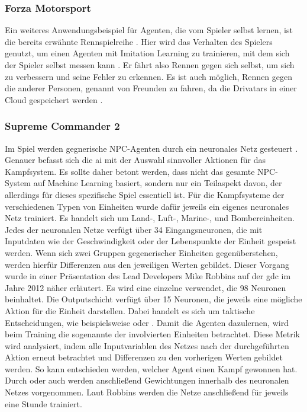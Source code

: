 \subsubsection{Forza Motorsport}
Ein weiteres Anwendungsbeispiel für Agenten, die vom Spieler selbst lernen, ist die bereits erwähnte Rennspielreihe  \cite{forza}. Hier wird das Verhalten des Spielers genutzt, um einen Agenten mit Imitation Learning zu trainieren, mit dem sich der Spieler selbst messen kann \cite{forza_article}. Er fährt also Rennen gegen sich selbst, um sich zu verbessern und seine Fehler zu erkennen. Es ist auch möglich, Rennen gegen die  anderer Personen, genannt  von Freunden zu fahren, da die Drivatars in einer Cloud gespeichert werden \cite{forza_dev_video}.


\subsubsection{Supreme Commander 2}
Im Spiel  \cite{supreme_commander} werden gegnerische NPC-Agenten durch ein neuronales Netz gesteuert \cite{supreme_commander_gdc}. Genauer befasst sich die \ac{ai} mit der Auswahl sinnvoller Aktionen für das Kampfsystem. Es sollte daher betont werden, dass nicht das gesamte NPC-System auf Machine Learning basiert, sondern nur ein Teilaspekt davon, der allerdings für dieses spezifische Spiel essentiell ist.
Für die Kampfsysteme der verschiedenen Typen von Einheiten wurde dafür jeweils ein eigenes neuronales Netz trainiert. Es handelt sich um Land-, Luft-, Marine-, und Bombereinheiten. Jedes der neuronalen Netze verfügt über 34 Eingangsneuronen, die mit Inputdaten wie der Geschwindigkeit oder der Lebenspunkte der Einheit gespeist werden. Wenn sich zwei Gruppen gegenerischer Einheiten gegenüberstehen, werden hierfür Differenzen aus den jeweiligen Werten gebildet. Dieser Vorgang wurde in einer Präsentation des Lead Developers Mike Robbins auf der \ac{gdc} \cite{gdc} im Jahre 2012 näher erläutert.
Es wird eine einzelne  verwendet, die 98 Neuronen beinhaltet. Die Outputschicht verfügt über 15 Neuronen, die jeweils eine mögliche Aktion für die Einheit darstellen. Dabei handelt es sich um taktische Entscheidungen, wie beispielsweise  oder . Damit die Agenten dazulernen, wird beim Training die sogenannte  der involvierten Einheiten betrachtet. Diese Metrik wird analysiert, indem alle Inputvariablen des Netzes nach der durchgeführten Aktion erneut betrachtet und Differenzen zu den vorherigen Werten gebildet werden. So kann entschieden werden, welcher Agent einen Kampf gewonnen hat. Durch  oder auch  werden anschließend Gewichtungen innerhalb des neuronalen Netzes vorgenommen. Laut Robbins werden die Netze anschließend für jeweils eine Stunde trainiert.

